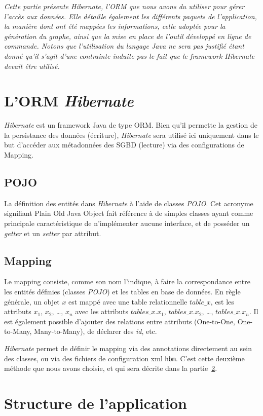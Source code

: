 \textit{Cette partie présente \emph{Hibernate}, l'ORM que nous avons du utiliser pour gérer l'accès aux données. Elle détaille également les différents paquets de l'application, la manière dont ont été mappées les informations, celle adoptée pour la génération du graphe, ainsi que la mise en place de l'outil développé en ligne de commande. Notons que l'utilisation du langage Java ne sera pas justifié étant donné qu'il s'agit d'une contrainte induite pas le fait que le framework \emph{Hibernate} devait être utilisé.}

\section{L'ORM \emph{Hibernate}}
\emph{Hibernate} est un framework Java de type ORM. Bien qu'il permette la gestion de la persistance des données (écriture), \emph{Hibernate} sera utilisé ici uniquement dans le but d'accéder aux métadonnées des SGBD (lecture) via des configurations de Mapping.
\subsection{POJO}
La définition des entités dans \emph{Hibernate} à l'aide de classes \emph{POJO}. Cet acronyme signifiant \og Plain Old Java Object \fg{} fait référence à de simples classes ayant comme principale caractéristique de n'implémenter aucune interface, et de posséder un \emph{getter} et un \emph{setter} par attribut.
\subsection{Mapping}
Le mapping consiste, comme son nom l'indique, à faire la correspondance entre les entités définies (classes \emph{POJO}) et les tables en base de données. En règle générale, un objet $x$ est mappé avec une table relationnelle $table\_x$, est les attributs $x_1$, $x_2$, \ldots, $x_n$ avec les attributs $tables\_x.x_1$, $tables\_x.x_2$, \ldots, $tables\_x.x_n$. Il est également possible d'ajouter des relations entre attributs (One-to-One, One-to-Many, Many-to-Many), de déclarer des \emph{id}, etc.

\emph{Hibernate} permet de définir le mapping via des annotations directement au sein des classes, ou via des fichiers de configuration xml \texttt{hbm}. C'est cette deuxième méthode que nous avons choisie, et qui sera décrite dans la partie~\ref{section:structure_de_lapplication}.

\section{Structure de l'application}
\label{section:structure_de_lapplication}

